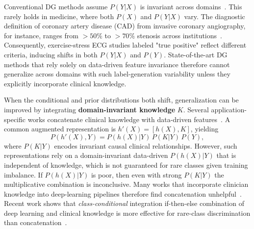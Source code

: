 \documentclass{article}
\begin{document}
Conventional DG methods assume $P(Y|X)$ is invariant across
domains~\cite{li2018domain}. This rarely holds in medicine, where both $P(X)$
and $P(Y|X)$ vary. The diagnostic definition of coronary artery disease
(CAD) from invasive coronary angiography, for instance, ranges from $>50\%$
to $>70\%$ stenosis across institutions~\cite{vazquez2024clinical}.
Consequently, exercise-stress ECG studies labeled "true positive" reflect
different criteria, inducing shifts in both $P(Y|X)$ and $P(Y)$. State-of-the-art
DG methods that rely solely on data-driven feature invariance therefore cannot
generalize across domains with such label-generation variability unless they
explicitly incorporate clinical knowledge.

When the conditional and prior distributions both shift, generalization can be
improved by integrating \textbf{domain-invariant knowledge} $K$. Several
application-specific works concatenate clinical knowledge with data-driven
features~\cite{Wong22, Hohn21_Cancer, Gessert20, Tschandl23, Hohn21_JMIR}.
A common augmented representation is $h'(X) = [h(X), K]$, yielding
\[
P(h'(X), Y) = P(h(X)|Y)\, P(K|Y)\, P(Y),
\]
where $P(K|Y)$ encodes invariant causal clinical relationships. However, such
representations rely on a domain-invariant data-driven $P(h(X)|Y)$ that is
independent of knowledge, which is not guaranteed for rare classes given
training imbalance. If $P(h(X)|Y)$ is poor, then even with strong $P(K|Y)$ the
multiplicative combination is inconclusive. Many works that incorporate
clinician knowledge into deep-learning pipelines therefore find concatenation
unhelpful~\cite{Wong22, Hohn21_Cancer, Gessert20, Tschandl23, Hohn21_JMIR}.
Recent work shows that \emph{class-conditional} integration if-then-else
combination of deep learning and clinical knowledge is more effective for
rare-class discrimination than concatenation~\cite{Hohn21_Cancer,
banerjee2023automated, kamboj2024expert, kamboj2024expertTAI}.


\end{document}
